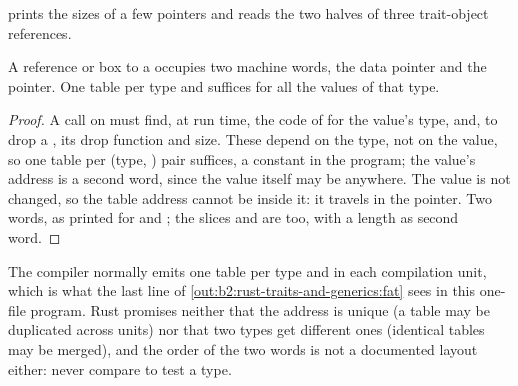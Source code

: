 \label{lst:b2:rust-traits-and-generics:shapes}

\label{out:b2:rust-traits-and-generics:shapes}

 prints the sizes of a few pointers and reads the two halves of three trait-object references.

\label{lst:b2:rust-traits-and-generics:fat}

\label{out:b2:rust-traits-and-generics:fat}

\begin{proposition}\label{prop:b2:rust-traits-and-generics:fat}
A reference or box to a  occupies two machine words, the data pointer and the  pointer. One
table per type and  suffices for all the values of that type.
\end{proposition}

\begin{proof}
A call  on  must find, at run time, the code of  for the value's type,
and, to drop a , its drop function and size. These depend on the type, not on the value, so one
table per (type, ) pair suffices, a constant in the program; the value's
address is a second word, since the value itself may be anywhere. The value is not changed, so the table address
cannot be inside it: it travels in the pointer. Two words, as printed for  and ; the slices \code{&[u32]} and  are  too, with a length as second word.
\end{proof}

The compiler normally emits one table per type and  in each compilation unit, which is what the last line of
\cref{out:b2:rust-traits-and-generics:fat} sees in this one-file program. Rust promises neither that the address is
unique (a table may be duplicated across units) nor that two types get different ones (identical tables may be
merged), and the order of the two words is not a documented layout either: never compare  to test a
type.

